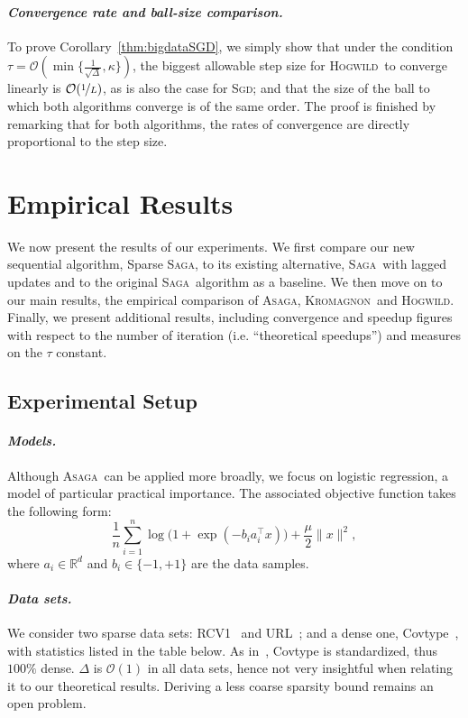 \documentclass[twoside, 11pt]{article}
\newcommand{\overlap}{\tau}
\newcommand{\sparsity}{\Delta}
\newcommand{\lipschitz}{L}
\newcommand{\ASAGA}{\textsc{Asaga}}
\newcommand{\SAGA}{\textsc{Saga}}
\newcommand{\Hogwild}{\textsc{Hogwild}}
\newcommand{\SGD}{\textsc{Sgd}}
\newcommand{\KROMAGNON}{\textsc{Kromagnon}}
\begin{document}
\paragraph{\textit{Convergence rate and ball-size comparison.}}
To prove Corollary~\ref{thm:bigdataSGD}, we simply show that under the condition $\overlap = \mathcal{O}({\min\{\frac{1}{\sqrt{\sparsity}}}, \kappa\})$, the biggest allowable step size for \Hogwild\ to converge linearly is $\mathcal{O}(\nicefrac{1}{\lipschitz})$, as is also the case for \SGD; and that the size of the ball to which both algorithms converge is of the same order.
The proof is finished by remarking that for both algorithms, the rates of convergence are directly proportional to the step size.

\section{Empirical Results}\label{results}
We now present the results of our experiments.
We first compare our new sequential algorithm, Sparse \SAGA, to its existing alternative, \SAGA\ with lagged updates and to the original \SAGA\ algorithm as a baseline.
We then move on to our main results, the empirical comparison of \ASAGA , \KROMAGNON\ and \Hogwild.
Finally, we present additional results, including convergence and speedup figures with respect to the number of iteration (i.e. ``theoretical speedups'') and measures on the $\overlap$ constant.

\subsection{Experimental Setup}\label{ImplDetails}
\paragraph{\textit{Models.}}
Although \ASAGA\ can be applied more broadly, we focus on logistic regression, a model of particular practical importance.
The associated objective function takes the following form:
\begin{equation}
\frac{1}{n} \sum_{i=1}^n \log\big(1 + \exp(- b_i a_i^\intercal x)\big) + \frac{\mu}{2} \|x\|^2,
\end{equation}
where $a_i \in \mathbb{R}^d$ and $b_i \in \{-1,+1\}$ are the data samples.

\paragraph{\textit{Data sets.}}
We consider two sparse data sets: RCV1~\citep{RCV1} and URL~\citep{URL}; and a dense one, Covtype~\citep{Covtype}, with statistics listed in the table below.
As in~\citet{SAG}, Covtype is standardized, thus $100\%$ dense.
$\sparsity$ is $\mathcal{O}(1)$ in all data sets, hence not very insightful when relating it to our theoretical results.
Deriving a less coarse sparsity bound remains an open problem.
\end{document}
